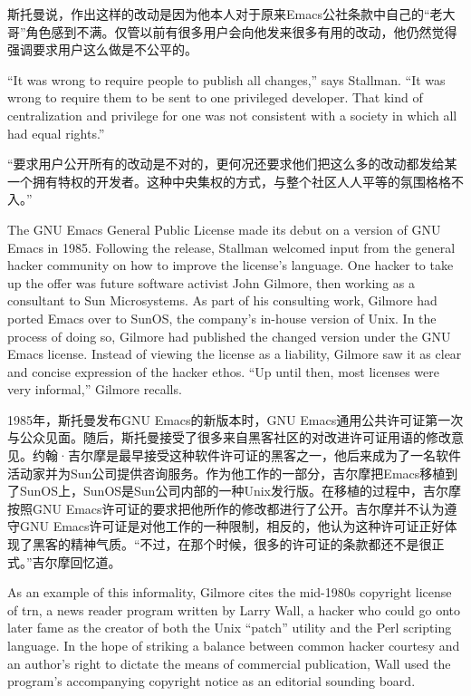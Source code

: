 \ifdefined\chs
斯托曼说，作出这样的改动是因为他本人对于原来Emacs公社条款中自己的``老大哥''角色感到不满。仅管以前有很多用户会向他发来很多有用的改动，他仍然觉得强调要求用户这么做是不公平的。
\fi

\ifdefined\eng
``It was wrong to require people to publish all changes,'' says Stallman. ``It was wrong to require them to be sent to one privileged developer. That kind of centralization and privilege for one was not consistent with a society in which all had equal rights.''
\fi

\ifdefined\chs
``要求用户公开所有的改动是不对的，更何况还要求他们把这么多的改动都发给某一个拥有特权的开发者。这种中央集权的方式，与整个社区人人平等的氛围格格不入。''
\fi

\ifdefined\eng
The GNU Emacs General Public License made its debut on a version of GNU Emacs in 1985. Following the release, Stallman welcomed input from the general hacker community on how to improve the license's language. One hacker to take up the offer was future software activist John Gilmore, then working as a consultant to Sun Microsystems. As part of his consulting work, Gilmore had ported Emacs over to SunOS, the company's in-house version of Unix. In the process of doing so, Gilmore had published the changed version under the GNU Emacs license. Instead of viewing the license as a liability, Gilmore saw it as clear and concise expression of the hacker ethos. ``Up until then, most licenses were very informal,'' Gilmore recalls.
\fi

\ifdefined\chs
1985年，斯托曼发布GNU Emacs的新版本时，GNU Emacs通用公共许可证第一次与公众见面。随后，斯托曼接受了很多来自黑客社区的对改进许可证用语的修改意见。约翰·吉尔摩是最早接受这种软件许可证的黑客之一，他后来成为了一名软件活动家并为Sun公司提供咨询服务。作为他工作的一部分，吉尔摩把Emacs移植到了SunOS上，SunOS是Sun公司内部的一种Unix发行版。在移植的过程中，吉尔摩按照GNU Emacs许可证的要求把他所作的修改都进行了公开。吉尔摩并不认为遵守GNU Emacs许可证是对他工作的一种限制，相反的，他认为这种许可证正好体现了黑客的精神气质。``不过，在那个时候，很多的许可证的条款都还不是很正式。''吉尔摩回忆道。
\fi

\ifdefined\eng
As an example of this informality, Gilmore cites the mid-1980s copyright license of trn, a news reader program written by Larry Wall, a hacker who could go onto later fame as the creator of both the Unix ``patch'' utility and the Perl scripting language. In the hope of striking a balance between common hacker courtesy and an author's right to dictate the means of commercial publication, Wall used the program's accompanying copyright notice as an editorial sounding board.
\fi

